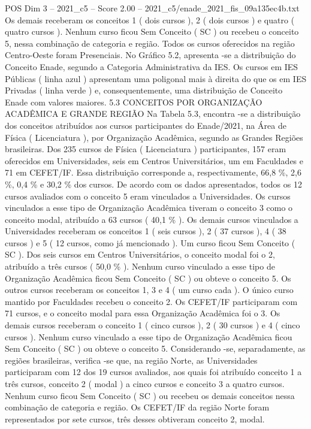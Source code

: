 \begin{textsample}{POS Dim 3 – 2021\_c5 – Score 2.00 – 2021\_c5/enade\_2021\_fis\_09a135ec4b.txt}
Os demais receberam os conceitos 1 ( dois cursos ), 2 ( dois cursos ) e quatro ( quatro cursos ).
Nenhum curso ficou Sem Conceito ( SC ) ou recebeu o conceito 5, nessa combinação de categoria e região.
Todos os cursos oferecidos na região Centro-Oeste foram Presenciais.
No Gráfico 5.2, apresenta -se a distribuição do Conceito Enade, segundo a Categoria Administrativa da IES.
Os cursos em IES Públicas ( linha azul ) apresentam uma poligonal mais à direita do que os em IES Privadas ( linha verde ) e, consequentemente, uma distribuição de Conceito Enade com valores maiores. 5.3 CONCEITOS POR ORGANIZAÇÃO ACADÊMICA E GRANDE REGIÃO Na Tabela 5.3, encontra -se a distribuição dos conceitos atribuídos aos cursos participantes do Enade/2021, na Área de Física ( Licenciatura ), por Organização Acadêmica, segundo as Grandes Regiões brasileiras.
Dos 235 cursos de Física ( Licenciatura ) participantes, 157 eram oferecidos em Universidades, seis em Centros Universitários, um em Faculdades e 71 em CEFET/IF.
Essa distribuição corresponde a, respectivamente, 66,8 \%, 2,6 \%, 0,4 \% e 30,2 \% dos cursos.
De acordo com os dados apresentados, todos os 12 cursos avaliados com o conceito 5 eram vinculados a Universidades.
Os cursos vinculados a esse tipo de Organização Acadêmica tiveram o conceito 3 como o conceito modal, atribuído a 63 cursos ( 40,1 \% ).
Os demais cursos vinculados a Universidades receberam os conceitos 1 ( seis cursos ), 2 ( 37 cursos ), 4 ( 38 cursos ) e 5 ( 12 cursos, como já mencionado ).
Um curso ficou Sem Conceito ( SC ).
Dos seis cursos em Centros Universitários, o conceito modal foi o 2, atribuído a três cursos ( 50,0 \% ).
Nenhum curso vinculado a esse tipo de Organização Acadêmica ficou Sem Conceito ( SC ) ou obteve o conceito 5.
Os outros cursos receberam os conceitos 1, 3 e 4 ( um curso cada ).
O único curso mantido por Faculdades recebeu o conceito 2.
Os CEFET/IF participaram com 71 cursos, e o conceito modal para essa Organização Acadêmica foi o 3.
Os demais cursos receberam o conceito 1 ( cinco cursos ), 2 ( 30 cursos ) e 4 ( cinco cursos ).
Nenhum curso vinculado a esse tipo de Organização Acadêmica ficou Sem Conceito ( SC ) ou obteve o conceito 5.
Considerando -se, separadamente, as regiões brasileiras, verifica -se que, na região Norte, as Universidades participaram com 12 dos 19 cursos avaliados, aos quais foi atribuído conceito 1 a três cursos, conceito 2 ( modal ) a cinco cursos e conceito 3 a quatro cursos.
Nenhum curso ficou Sem Conceito ( SC ) ou recebeu os demais conceitos nessa combinação de categoria e região.
Os CEFET/IF da região Norte foram representados por sete cursos, três desses obtiveram conceito 2, modal.

\end{textsample}
